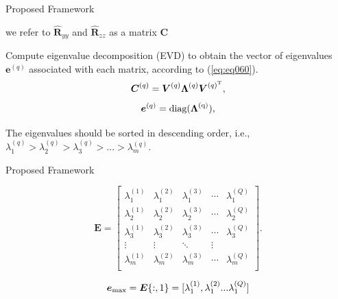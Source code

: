 \documentclass[newPxFont, numfooter, sectionpages]{beamer}
\begin{document}
\begin{frame}{Proposed Framework}
	
	we refer to $\boldsymbol{\hat{R}}_{yy}$ and $\boldsymbol{\hat{R}}_{zz}$ as a matrix $\boldsymbol{C}$

	Compute eigenvalue decomposition (EVD) to obtain the vector of eigenvalues $\boldsymbol{e}^{(q)}$ associated with each matrix, according to (\ref{eq:eq060}).
	\begin{equation}\label{eq:eq06}
	\boldsymbol{C}^{(q)} = \boldsymbol{V}^{(q)}\boldsymbol{\Lambda}^{(q)}\boldsymbol{V}^{(q)^{\rm T}},
	\end{equation}
	\begin{equation}\label{eq:eq060}
	\boldsymbol{e}^{(q)} = \rm diag(\boldsymbol{\Lambda}^{(q)}),
	\end{equation}

	The eigenvalues should be sorted in descending order, i.e., $\lambda_{1}^{(q)} > \lambda_{2}^{(q)} > \lambda_{3}^{(q)} > ... > \lambda_{m}^{(q)}$.

\end{frame}
\begin{frame}{Proposed Framework}
	
	\begin{equation}\label{eq:eq07}
		\boldsymbol{E} =
		\begin{bmatrix}
			\lambda_1^{(1)} & \lambda_1^{(2)} & \lambda_1^{(3)} & \cdots & \lambda_1^{(Q)} \\
			\lambda_2^{(1)} & \lambda_2^{(2)} & \lambda_2^{(3)} & \cdots & \lambda_2^{(Q)} \\
			\lambda_3^{(1)} & \lambda_3^{(2)} & \lambda_3^{(3)} & \cdots & \lambda_3^{(Q)} \\
			\vdots & \vdots & \ddots & \vdots  \\
			\lambda_m^{(1)} & \lambda_m^{(2)} & \lambda_m^{(3)} & \cdots & \lambda_m^{(Q)} \\
		\end{bmatrix}.
	\end{equation}

	\begin{equation}\label{eq:eq08}
		\boldsymbol{e}_{\rm max} = \boldsymbol{E}\{:,1\} = [ \lambda_1^{(1)}, \lambda_1^{(2)} ... \lambda_1^{(Q)}]
	\end{equation}

\end{frame}
\end{document}
